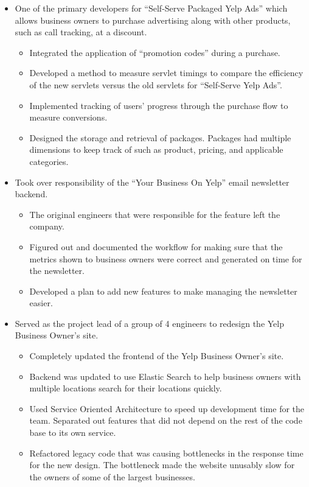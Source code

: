 \documentclass{article}
\newenvironment{changemargin}[2]{%
  \begin{list}{}{%
    \setlength{\topsep}{0pt}%
    \setlength{\leftmargin}{#1}%
    \setlength{\rightmargin}{#2}%
    \setlength{\listparindent}{\parindent}%
    \setlength{\itemindent}{\parindent}%
    \setlength{\parsep}{\parskip}%
  }%
  \item[]}{\end{list}
}
\newenvironment{body} {
  \vspace*{-16pt}
  \begin{changemargin}{-0.25in}{-0.5in}
  }
  {\end{changemargin}
}
\begin{document}
\begin{body}
\begin{itemize}
    \item One of the primary developers for ``Self-Serve Packaged Yelp Ads'' which allows business owners to purchase advertising along with other products, such as call tracking, at a discount.
    \begin{itemize} \itemsep -0pt
      \item Integrated the application of ``promotion codes'' during a purchase.
      \item Developed a method to measure servlet timings to compare the efficiency of the new servlets versus the old servlets for ``Self-Serve Yelp Ads''.
      \item Implemented tracking of users' progress through the purchase flow to measure conversions.
      \item Designed the storage and retrieval of packages. Packages had multiple dimensions to keep track of such as product, pricing, and applicable categories.
    \end{itemize}

    \item Took over responsibility of the ``Your Business On Yelp'' email newsletter backend.
    \begin{itemize} \itemsep -0pt
      \item The original engineers that were responsible for the feature left the company.
      \item Figured out and documented the workflow for making sure that the metrics shown to business owners were correct and generated on time for the newsletter.
      \item Developed a plan to add new features to make managing the newsletter easier.
    \end{itemize}

    \item Served as the project lead of a group of 4 engineers to redesign the Yelp Business Owner's site.
    \begin{itemize} \itemsep -0pt
      \item Completely updated the frontend of the Yelp Business Owner's site.
      \item Backend was updated to use Elastic Search to help business owners with multiple locations search for their locations quickly.
      \item Used Service Oriented Architecture to speed up development time for the team. Separated out features that did not depend on the rest of the code base to its own service.
      \item Refactored legacy code that was causing bottlenecks in the response time for the new design. The bottleneck made the website unusably slow for the owners of some of the largest businesses.
    \end{itemize}


\end{itemize}
\end{body}
\end{document}
